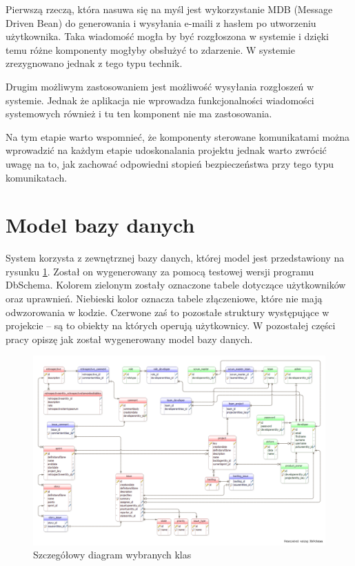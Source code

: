 Pierwszą rzeczą, która nasuwa się na myśl jest wykorzystanie MDB (Message Driven Bean) do generowania i wysyłania e-maili z hasłem po utworzeniu użytkownika. Taka wiadomość mogła by być rozgłoszona w systemie i dzięki temu różne komponenty mogłyby obsłużyć to zdarzenie. W systemie zrezygnowano jednak z tego typu technik.

Drugim możliwym zastosowaniem jest możliwość wysyłania rozgłoszeń w systemie. Jednak że aplikacja nie wprowadza funkcjonalności wiadomości systemowych również i tu ten komponent nie ma zastosowania.

Na tym etapie warto wspomnieć, że komponenty sterowane komunikatami można wprowadzić na każdym etapie udoskonalania projektu jednak warto zwrócić uwagę na to, jak zachować odpowiedni stopień bezpieczeństwa przy tego typu komunikatach.

\section{Model bazy danych}
System korzysta z zewnętrznej bazy danych, której model jest przedstawiony na rysunku \ref{fig:modeldb}. Został on wygenerowany za pomocą testowej wersji programu DbSchema. Kolorem zielonym zostały oznaczone tabele dotyczące użytkowników oraz uprawnień. Niebieski kolor oznacza tabele złączeniowe, które nie mają odwzorowania w kodzie. Czerwone zaś to pozostałe struktury występujące w projekcie -- są to obiekty na których operują użytkownicy. W pozostałej części pracy opiszę jak został wygenerowany model bazy danych.

\begin{figure}
	\centering
	\includegraphics[width=25cm]{rysunki/modeldb.png}	
	\caption{Szczegółowy diagram wybranych klas}
	\label{fig:modeldb}
\end{figure}